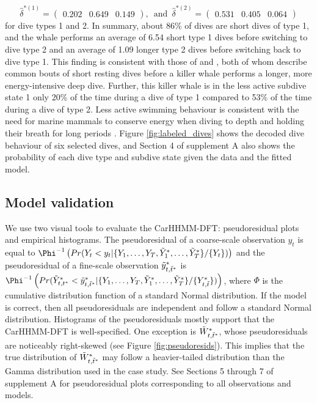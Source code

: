 \[\hat \delta^{*(1)} = \begin{pmatrix} 0.202 & 0.649 & 0.149 \end{pmatrix}, \enspace \text{and} \enspace \hat \delta^{*(2)} = \begin{pmatrix} 0.531 & 0.405 & 0.064 \end{pmatrix}\]
%
for dive types 1 and 2.
In summary, about 86\% of dives are short dives of type 1, and the whale performs an average of 6.54 short type 1 dives before switching to dive type 2 and an average of 1.09 longer type 2 dives before switching back to dive type 1. This finding is consistent with those of \citet{Tennessen:2019b} and \citet{Williams:2009}, both of whom describe common bouts of short resting dives before a killer whale performs a longer, more energy-intensive deep dive.
Further, this killer whale is in the less active subdive state 1 only 20\% of the time during a dive of type 1 compared to 53\% of the time during a dive of type 2. Less active swimming behaviour is consistent with the need for marine mammals to conserve energy when diving to depth and holding their breath for long periods \citep{Williams:1999,Hastie:2006}. Figure \ref{fig:labeled_dives} shows the decoded dive behaviour of six selected dives, and Section 4 of supplement A also shows the probability of each dive type and subdive state given the data and the fitted model.

\subsection{Model validation}
\label{subsec:model_validation}

We use two visual tools to evaluate the CarHHMM-DFT: pseudoresidual plots and empirical histograms. The pseudoresidual of a coarse-scale observation $y_t$ is equal to $\Phi^{-1} \left(Pr(Y_t < y_t|\{Y_1,\ldots,Y_T,\Z_1,\ldots,\Z_T\}/\{Y_t\}) \right)$ and the pseudoresidual of a fine-scale observation $\tilde{y}^*_{t,\tilde t^*}$ is $\Phi^{-1} \left(Pr(\Z_{t,t^*} < \z_{t,\tilde t^*}|\{Y_1,\ldots,Y_T,\Z_1,\ldots,\Z_T\}/\{Y^*_{t,\tilde t}\}) \right)$, where $\Phi$ is the cumulative distribution function of a standard Normal distribution. If the model is correct, then all pseudoresiduals are independent and follow a standard Normal distribution. Histograms of the pseudoresiduals mostly support that the CarHHMM-DFT is well-specified. One exception is $\tilde{W}^*_{t,\tilde t^*}$, whose pseudoresiduals are noticeably right-skewed (see Figure \ref{fig:pseudoresids}). This implies that the true distribution of $\tilde{W}^*_{t,\tilde t^*}$ may follow a heavier-tailed distribution than the Gamma distribution used in the case study. See Sections 5 through 7 of supplement A for pseudoresidual plots corresponding to all observations and models.

